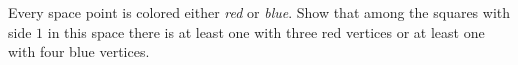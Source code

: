 Every space point is colored either \emph{red} or \emph{blue}. Show that among the squares with side $1$ in this space there is at least one with three red vertices or at least one with four blue vertices.
